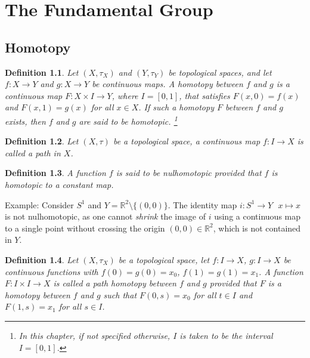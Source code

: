 \documentclass[11pt]{book}
\theoremstyle{break}
\theoremstyle{break}
\newtheorem{defn}{Definition}[corL]
\newcommand{\R}{\mathbb{R}}
\newcommand{\example}{\color{green}Example: \color{black}}
\begin{document}
\newpage
\chapter{The Fundamental Group}
\setcounter{section}{20}
\section[Homotopy]{\color{red}Homotopy\color{black}}
\begin{defn}
Let $(X,\tau_X)$ and $(Y,\tau_Y)$ be topological spaces, and let $f:X \to Y$ and $g:X\to Y$ be continuous maps. A homotopy between $f$ and $g$ is a continuous map $F:X \times I \to Y$, where $I = [0,1]$, that satisfies $F(x,0) = f(x)$ and $F(x,1) = g(x)$ for all $x \in X$. If such a homotopy $F$ between $f$ and $g$ exists, then $f$ and $g$ are said to be homotopic.  \footnote{In this chapter, if not specified otherwise, $I$ is taken to be the interval $I = [0,1]$.}
\end{defn}

\begin{defn}
Let $(X,\tau)$ be a topological space, a continuous map $f:I \to X$ is called a path in $X$. 
\end{defn}

\begin{defn}
A function $f$ is said to be nulhomotopic provided that $f$ is homotopic to a constant map. 
\end{defn}

\example Consider $S^1$ and $Y = \R^2 \setminus \{(0,0)\}$. The identity map $i:S^1 \to Y \ \ \ x\mapsto x$ is not nulhomotopic, as one cannot \textit{shrink} the image of $i$ using a continuous map to a single point without crossing the origin $(0,0) \in \R^2$, which is not contained in $Y$. 

\begin{defn}
Let $(X,\tau_X)$ be a topological space, let $f:I \to X$, $g:I \to X$  be continuous functions with $f(0) =g(0) = x_0$, $f(1) = g(1) = x_1$. A function $F:I\times I\to X$ is called a path homotopy between $f$ and $g$ provided that $F$ is a homotopy between $f$ and $g$ such that $F(0,s) = x_0$ for all $t \in I$ and $F(1,s) = x_1$ for all $s \in I$. 
\end{defn}
\end{document}
